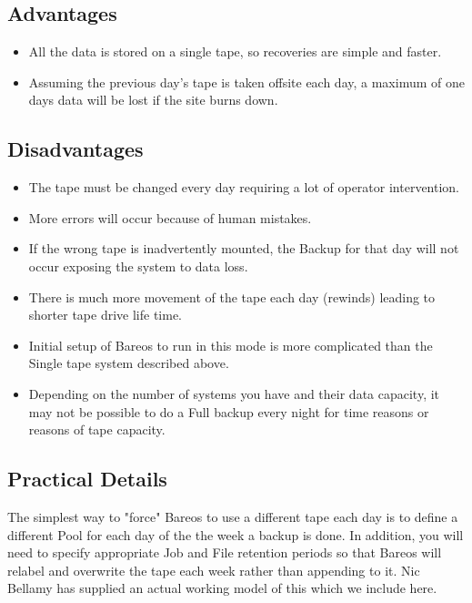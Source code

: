 \subsection{Advantages}

\begin{itemize}
\item All the data is stored on a single tape, so recoveries  are simple and
   faster.
\item Assuming the previous day's tape is taken offsite each  day, a maximum
   of one days data will be lost if the  site burns down.
   \end{itemize}

\subsection{Disadvantages}

\begin{itemize}
\item The tape must be changed every day requiring a lot of  operator
   intervention.
\item More errors will occur because of human mistakes.
\item If the wrong tape is inadvertently mounted, the Backup for  that day
   will not occur exposing the system to data loss.
\item There is much more movement of the tape each day (rewinds)  leading to
   shorter tape drive life time.
\item Initial setup of Bareos to run in this mode is more complicated  than
   the Single tape system described above.
\item Depending on the number of systems you have and their data  capacity, it
   may not be possible to do a Full backup every  night for time reasons or
   reasons of tape capacity.
\end{itemize}

\subsection{Practical Details}

The simplest way to "force" Bareos to use a different tape each day is to
define a different Pool for each day of the the week a backup is done. In
addition, you will need to specify appropriate Job and File retention periods
so that Bareos will relabel and overwrite the tape each week rather than
appending to it. Nic Bellamy has supplied an actual working model of this
which we include here.

